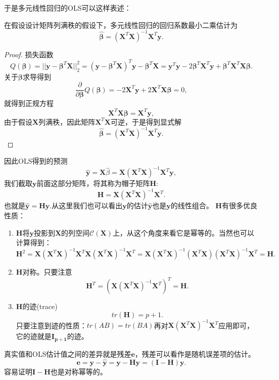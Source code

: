 \documentclass[lang=cn,10pt]{elegantbook}
\begin{document}
    于是多元线性回归的OLS可以这样表述：
    \begin{theorem}[多元线性回归OLS]
        在假设设计矩阵列满秩的假设下，多元线性回归的回归系数最小二乘估计为
        \[\hat{\mathbf{\beta}}=(\mathbf{X}^T\mathbf{X})^{-1}\mathbf{X}^T\mathbf{y}.\]
    \end{theorem}
    \begin{proof}
        损失函数
        \[Q(\mathbf{\beta})=||\mathbf{y}-\mathbf{\beta}^T\mathbf{X}||_2^2=(\mathbf{y}-\mathbf{\beta}^T\mathbf{X})^T\mathbf{y}-\mathbf{\beta}^T\mathbf{X}=\mathbf{y}^T\mathbf{y}-2\mathbf{\beta}^T\mathbf{X}^T\mathbf{y}+\mathbf{\beta}^T\mathbf{X}^T\mathbf{X}\mathbf{\beta}.\]
        关于\(\mathbf{\beta}\)求导得到
        \[\frac{\partial}{\partial \mathbf{\beta}}Q(\mathbf{\beta})=-2\mathbf{X}^T\mathbf{y}+2\mathbf{X}^T\mathbf{X}\mathbf{\beta}=0,\]
        就得到正规方程
        \[\mathbf{X}^T\mathbf{X}\mathbf{\beta}=\mathbf{X}^T\mathbf{y},\]
        由于假设\(\mathbf{X}\)列满秩，因此矩阵\(\mathbf{X}^T\mathbf{X}\)可逆，于是得到显式解
        \[\hat{\mathbf{\beta}}=(\mathbf{X}^T\mathbf{X})^{-1}\mathbf{X}^T\mathbf{y}.\]
    \end{proof}
    因此OLS得到的预测
    \[\hat{\mathbf{y}}=\mathbf{X}\hat{\beta}=\mathbf{X}(\mathbf{X}^T\mathbf{X})^{-1}\mathbf{X}^T\mathbf{y},\]
    我们截取\(\mathbf{y}\)前面这部分矩阵，将其称为帽子矩阵\(\mathbf{H}\):
    \[\mathbf{H}=\mathbf{X}(\mathbf{X}^T\mathbf{X})^{-1}\mathbf{X}^T.\]
    也就是\(\hat{\mathbf{y}}=\mathbf{H}\mathbf{y}\).从这里我们也可以看出\(\mathbf{y}\)的估计\(\hat{\mathbf{y}}\)也是\(\mathbf{y}\)的线性组合。
    \(\mathbf{H}\)有很多优良性质：
    \begin{property}
        \begin{enumerate}
            \item \(\mathbf{H}\)将\(\mathbf{y}\)投影到\(\mathbf{X}\)的列空间\(\mathcal{C}(\mathbf{X})\)上，从这个角度来看它是幂等的。当然也可以计算得到：\[\mathbf{H}^2=\mathbf{X}(\mathbf{X}^T\mathbf{X})^{-1}\mathbf{X}^T\mathbf{X}(\mathbf{X}^T\mathbf{X})^{-1}\mathbf{X}^T=\mathbf{X}(\mathbf{X}^T\mathbf{X})^{-1}(\mathbf{X}^T\mathbf{X})(\mathbf{X}^T\mathbf{X})^{-1}\mathbf{X}^T=\mathbf{H}.\]
            \item \(\mathbf{H}\)对称。只要注意\[\mathbf{H}^T=(\mathbf{X}(\mathbf{X}^T\mathbf{X})^{-1}\mathbf{X}^T)^T=\mathbf{H}.\]
            \item \(\mathbf{H}\)的迹(trace)\[tr(\mathbf{H})=p+1.\]只要注意到迹的性质：\(tr(AB)=tr(BA)\)再对\(\mathbf{X}(\mathbf{X}^T\mathbf{X})^{-1}\mathbf{X}^T\)应用即可，它的迹就是\(\mathbf{I_{p+1}}\)的迹。
        \end{enumerate}
    \end{property}
    真实值和OLS估计值之间的差异就是残差\(\mathbf{e}\)，残差可以看作是随机误差项的估计。
    \[\mathbf{e}=\mathbf{y}-\hat{\mathbf{y}}=\mathbf{y}-\mathbf{H}\mathbf{y}=(\mathbf{I}-\mathbf{H})\mathbf{y}.\]
    容易证明\(\mathbf{I-H}\)也是对称幂等的。
\end{document}
